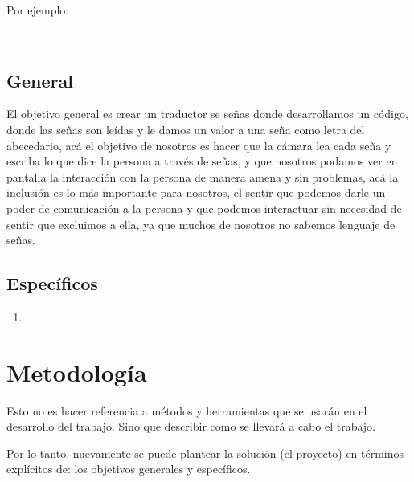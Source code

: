 \documentclass[letter,12pt]{report}
\begin{document}
Por ejemplo:
  \begin{itemize}
  \
\end{itemize}
\subsection{General}
El objetivo general es crear un traductor se señas donde desarrollamos un código, donde las señas son leídas y le damos un valor a una seña como letra del abecedario, acá el objetivo de nosotros es hacer que la cámara lea cada seña y escriba lo que dice la persona a través de señas, y que nosotros podamos ver en pantalla la interacción con la persona de manera amena y sin problemas, acá la inclusión es lo más importante para nosotros, el sentir que podemos darle un poder de comunicación a la persona y que podemos interactuar sin necesidad de sentir que excluimos a ella, ya que muchos de nosotros no sabemos lenguaje de señas.

\subsection{Específicos}
\begin{enumerate}\justifying
  Objetivos más específicos para nosotros fueron, el código que creamos en python, el cual nos ayudó a que las señas puedan ser leídas a través de la cámara, ESP32 CAM, donde tuvimos que ingresar seña a seña del lenguaje MNIST, nosotros estuvimos modificando cada gesto en la pantalla que para al final se pueda ingresar bien el lenguaje, si la mano no es bien detectada, la pantalla va a indicar que no se puede leer y en eso nos propusimos indicar que la cámara ESP32CAM, necesita leer de nuevo la mano y así poder indicar lo que se dice en la pantalla indicada.
 
  \item \lipsum[1]%

\end{enumerate}



\section{Metodología}
Esto no es hacer referencia a métodos y herramientas que se usarán en el desarrollo del trabajo. Sino que describir como se llevará a cabo el trabajo.

Por lo tanto, nuevamente se puede plantear la solución (el proyecto) en términos explícitos de: los objetivos generales y específicos.
\end{document}
